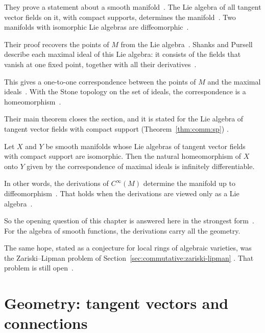 They prove a statement about a smooth
manifold~\cite[p.~468]{ShanksPursell1954}. The Lie algebra of all tangent
vector fields on it, with compact supports, determines the
manifold~\cite[p.~468]{ShanksPursell1954}. Two manifolds with isomorphic Lie
algebras are diffeomorphic~\cite[p.~468]{ShanksPursell1954}.

Their proof recovers the points of $M$ from the Lie
algebra~\cite[p.~470]{ShanksPursell1954}. Shanks and Pursell describe each
maximal ideal of this Lie algebra: it consists of the fields that vanish at
one fixed point, together with all their
derivatives~\cite[Theorem~1, p.~470]{ShanksPursell1954}.

This gives a one-to-one correspondence between the points of $M$ and the
maximal ideals~\cite[Theorem~2, p.~471]{ShanksPursell1954}. With the Stone
topology on the set of ideals, the correspondence is a
homeomorphism~\cite[Theorem~2, p.~471]{ShanksPursell1954}.

Their main theorem closes the section, and it is stated for the Lie algebra of
tangent vector fields with compact support (Theorem~\ref{thm:comm:sp})
\cite[Theorem~3, p.~471]{ShanksPursell1954}.\begin{theorem}\label{thm:comm:sp}
Let $X$ and $Y$ be smooth manifolds whose Lie algebras of tangent vector
fields with compact support are isomorphic. Then the natural homeomorphism of
$X$ onto $Y$ given by the correspondence of maximal ideals is infinitely
differentiable.
\end{theorem}

In other words, the derivations of $C^\infty(M)$ determine the manifold up to
diffeomorphism~\cite[Theorem~3, p.~471]{ShanksPursell1954}. That holds when the
derivations are viewed only as a
Lie algebra~\cite[Theorem~3, p.~471]{ShanksPursell1954}.

So the opening question of this chapter is answered here in the strongest
form~\cite[Theorem~3, p.~471]{ShanksPursell1954}. For the algebra of smooth
functions, the derivations carry all the geometry.

The same hope, stated as a conjecture for local rings of algebraic varieties,
was the Zariski--Lipman problem of
Section~\ref{sec:commutative:zariski-lipman}
\cite[p.~270]{BiswasGurjarKolte2014}. That problem is still
open~\cite[p.~270]{BiswasGurjarKolte2014}.

\section{Geometry: tangent vectors and connections}\label{sec:commutative:geometry}

